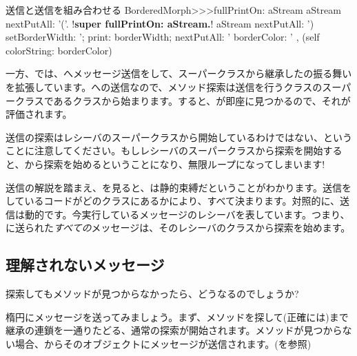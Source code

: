 \documentclass[a4paper,10pt,twoside]{book}
\begin{document}
\begin{method}[fullPrintOn]{\super 送信と\self 送信を組み合わせる}
BorderedMorph>>>fullPrintOn: aStream
	aStream nextPutAll: '('.
	!\textbf{super fullPrintOn: aStream.}!
	aStream nextPutAll: ') setBorderWidth: '; print: borderWidth;
		nextPutAll: ' borderColor: ' , (self colorString: borderColor)
\end{method}
一方、では、\super へメッセージ送信をして、スーパークラスから継承したの振る舞いを拡張しています。\super への送信なので、メソッド探索は\super 送信を行うクラスのスーパークラスであるクラスから始まります。すると、が即座に見つかるので、それが評価されます。

\super 送信の探索はレシーバのスーパークラスから開始しているわけではない、ということに注意してください。もしレシーバのスーパークラスから探索を開始すると、から探索を始めるということになり、無限ループになってしまいます!


\super 送信の解説を踏まえ、を見ると、\super は静的束縛だということがわかります。\super 送信をしているコードがどのクラスにあるかにより、すべて決まります。対照的に、\self 送信は動的です。今実行しているメッセージのレシーバを表しています。つまり、\self に送られた\emph{すべての}メッセージは、そのレシーバのクラスから探索を始めます。

\subsection{理解されないメッセージ}

探索してもメソッドが見つからなかったら、どうなるのでしょうか?

楕円にメッセージを送ってみましょう。まず、メソッドを探して(正確には)まで継承の連鎖を一通りたどる、通常の探索が開始されます。メソッドが見つからない場合、からそのオブジェクトにメッセージが送信されます。(を参照)
\end{document}

